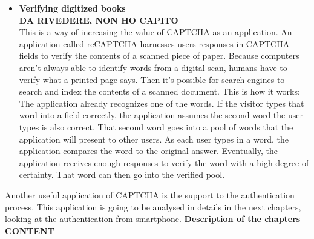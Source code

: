 \begin{itemize}
\item{\textbf{Verifying digitized books}\\
\textbf{DA RIVEDERE, NON HO CAPITO}\\
This is a way of increasing the value of CAPTCHA as an application. An application called reCAPTCHA harnesses users responses in CAPTCHA fields to verify the contents of a scanned piece of paper. Because computers aren't always able to identify words from a digital scan, humans have to verify what a printed page says. Then it's possible for search engines to search and index the contents of a scanned document. This is how it works: The application already recognizes one of the words. If the visitor types that word into a field correctly, the application assumes the second word the user types is also correct. That second word goes into a pool of words that the application will present to other users. As each user types in a word, the application compares the word to the original answer. Eventually, the application receives enough responses to verify the word with a high degree of certainty. That word can then go into the verified pool.
}
\end{itemize}
Another useful application of CAPTCHA is the support to the authentication process. This application is going to be analysed in details in the next chapters, looking at the authentication from smartphone.
\textbf{Description of the chapters CONTENT}